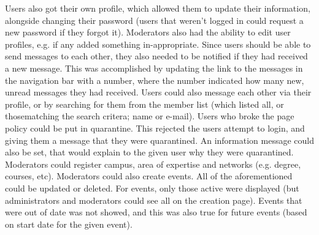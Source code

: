 Users also got their own profile, which allowed them to update their information, alongside changing their password 
(users that weren't logged in could request a new password if they forgot it). 
Moderators also had the ability to edit user profiles, e.g. if any added something in-appropriate.
\vspace{0.5em}\newline
Since users should be able to send messages to each other, they also needed to be notified if they had received a new message.
This was accomplished by updating the link to the messages in the navigation bar with a number, where the number indicated how many new, unread messages they had received. 
Users could also message each other via their profile, or by searching for them from the member list (which listed all, or thosematching the search critera; name or e-mail). 
Users who broke the page policy could be put in quarantine. 
This rejected the users attempt to login, and giving them a message that they were quarantined. 
An information message could also be set, that would explain to the given user why they were quarantined.
\vspace{0.5em}\newline
Moderators could register campus, area of expertise and networks (e.g. degree, courses, etc).
Moderators could also create events. 
All of the aforementioned could be updated or deleted. 
For events, only those active were displayed (but administrators and moderators could see all on the creation page). 
Events that were out of date was not showed, and this was also true for future events (based on start date for the given event).

